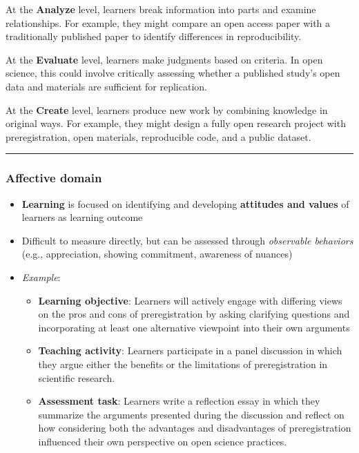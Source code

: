 \documentclass[
  letterpaper,
  DIV=11,
  numbers=noendperiod]{scrartcl}
\providecommand{\tightlist}{%
  \setlength{\itemsep}{0pt}\setlength{\parskip}{0pt}}
\begin{document}
At the \textbf{Analyze} level, learners break information into parts and
examine relationships. For example, they might compare an open access
paper with a traditionally published paper to identify differences in
reproducibility.

At the \textbf{Evaluate} level, learners make judgments based on
criteria. In open science, this could involve critically assessing
whether a published study's open data and materials are sufficient for
replication.

At the \textbf{Create} level, learners produce new work by combining
knowledge in original ways. For example, they might design a fully open
research project with preregistration, open materials, reproducible
code, and a public dataset.

\begin{center}\rule{0.5\linewidth}{0.5pt}\end{center}

\subsubsection{Affective domain}\label{affective-domain}

\begin{itemize}
\item
  \textbf{Learning} is focused on identifying and developing
  \textbf{attitudes and values} of learners as learning outcome
\item
  Difficult to measure directly, but can be assessed through
  \emph{observable behaviors} (e.g., appreciation, showing commitment,
  awareness of nuances)
\item
  \emph{Example}:

  \begin{itemize}
  \tightlist
  \item
    \textbf{Learning objective}: Learners will actively engage with
    differing views on the pros and cons of preregistration by asking
    clarifying questions and incorporating at least one alternative
    viewpoint into their own arguments
  \item
    \textbf{Teaching activity}: Learners participate in a panel
    discussion in which they argue either the benefits or the
    limitations of preregistration in scientific research.
  \item
    \textbf{Assessment task}: Learners write a reflection essay in which
    they summarize the arguments presented during the discussion and
    reflect on how considering both the advantages and disadvantages of
    preregistration influenced their own perspective on open science
    practices.
  \end{itemize}
\end{itemize}
\end{document}
